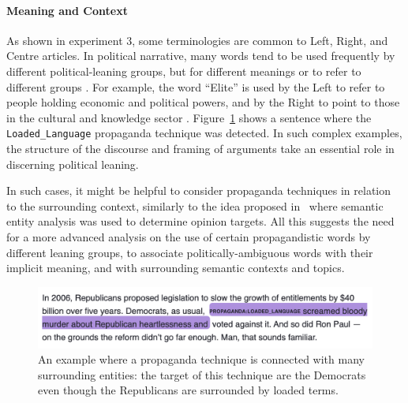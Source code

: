 \paragraph{Meaning and Context} As shown in experiment 3, some terminologies are common to Left, Right, and Centre articles. In political narrative, many words tend to be used frequently by different political-leaning groups, but for different meanings or to refer to different groups \cite{seargeant2020art}. For example, the word ``Elite'' is used by the Left to refer to people holding economic and political powers, and by the Right to point to those in the cultural and knowledge sector \cite{seargeant2020art}.  
Figure~\ref{fig:propaganda_example_2} shows a sentence where the \texttt{Loaded\_Language} propaganda technique was detected. In such complex examples, the structure of the discourse and framing of arguments take an essential role in discerning political leaning. 

In such cases, it might be helpful to consider propaganda techniques in relation to the surrounding context, similarly to the idea proposed in~\citet{chen2017opinion} where semantic entity analysis was used to determine opinion targets. 
All this suggests the need for a more advanced analysis on the use of certain propagandistic words by different leaning groups, to associate politically-ambiguous words with their implicit meaning, and with surrounding semantic contexts and topics.



\begin{figure}[!tb]
    \centering
    \includegraphics[width=\linewidth]{figures/propaganda_example_2.png}
    \vspace{-20px}
    \caption{An example where a propaganda technique is connected with many surrounding entities: the target of this technique are the Democrats even though the Republicans are surrounded by loaded terms.}
    \vspace{-8px}
    \label{fig:propaganda_example_2}
\end{figure}

